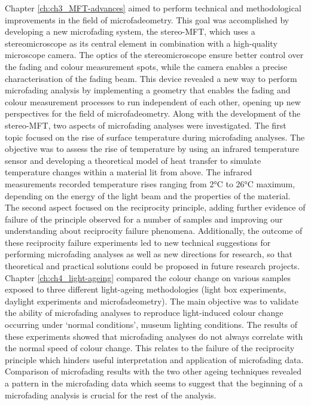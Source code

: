 Chapter \ref{ch:ch3_MFT-advances} aimed to perform technical and methodological improvements in the field of microfadeometry. This goal was accomplished by developing a new microfading system, \ie the stereo-MFT, which uses a stereomicroscope as its central element in combination with a high-quality microscope camera. The optics of the stereomicroscope ensure better control over the fading and colour measurement spots, while the camera enables a precise characterisation of the fading beam. This device revealed a new way to perform microfading analysis by implementing a geometry that enables the fading and colour measurement processes to run independent of each other, opening up new perspectives for the field of microfadeometry. Along with the development of the stereo-MFT, two aspects of microfading analyses were investigated. The first topic focused on the rise of surface temperature during microfading analyses. The objective was to assess the rise of temperature by using an infrared temperature sensor and developing a theoretical model of heat transfer to simulate temperature changes within a material lit from above. The infrared measurements recorded temperature rises ranging from 2\unit{\degreeCelsius} to 26\unit{\degreeCelsius} maximum, depending on the energy of the light beam and the properties of the material. The second aspect focused on the reciprocity principle, adding further evidence of failure of the principle observed for a number of samples and improving our understanding about reciprocity failure phenomena. Additionally, the outcome of these reciprocity failure experiments led to new technical suggestions for performing microfading analyses as well as new directions for research, so that theoretical and practical solutions could be proposed in future research projects.\\


Chapter \ref{ch:ch4_light-ageing} compared the colour change on various samples exposed to three different light-ageing methodologies (light box experiments, daylight experiments and microfadeometry). The main objective was to validate the ability of microfading analyses to reproduce light-induced colour change occurring under ‘normal conditions’, \ie museum lighting conditions. The results of these experiments showed that microfading analyses do not always correlate with the normal speed of colour change. This relates to the failure of the reciprocity principle which hinders useful interpretation and application of microfading data. Comparison of microfading results with the two other ageing techniques revealed a pattern in the microfading data which seems to suggest that the beginning of a microfading analysis is crucial for the rest of the analysis.\\


